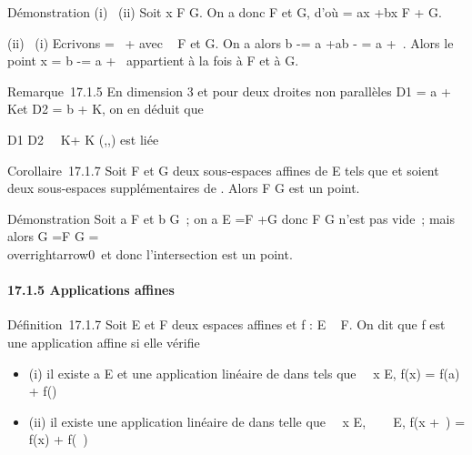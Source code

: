 Démonstration (i) \rigtharrow~(ii) Soit x \in F \bigcap G. On a donc
\overrightarrowax \in\overrightarrow
F et \overrightarrowxb
\in\overrightarrow G, d'où
\overrightarrowab =\overrightarrow
ax +\overrightarrow bx
\in\overrightarrow F +\overrightarrow
G.

(ii) \rigtharrow~(i) Ecrivons \overrightarrowab
=\overrightarrow \xi~ +\overrightarrow
\eta avec \overrightarrow\xi~
\in\overrightarrow F et
\overrightarrow\eta \in\overrightarrow
G. On a alors b -\overrightarrow \eta = a
+\overrightarrow ab -\overrightarrow
\eta = a +\overrightarrow \xi~. Alors le point x = b
-\overrightarrow \eta = a
+\overrightarrow \xi~ appartient à la fois à F et à G.

Remarque~17.1.5 En dimension 3 et pour deux droites non parallèles
D1 = a + K\vecu et D2 = b +
K\vecv, on en déduit que

D1 \bigcap
D2\neq~\varnothing~\mathrel\Leftrightarrow
\overrightarrowab \in K\vecu +
K\vecv \Leftrightarrow
(\overrightarrowab,\vecu,\vecv)\text
est liée 

Corollaire~17.1.7 Soit F et G deux sous-espaces affines de E tels que
\overrightarrowF et
\overrightarrowG soient deux sous-espaces
supplémentaires de \overrightarrowE. Alors F \bigcap G est
un point.

Démonstration Soit a \in F et b \in G~; on a
\overrightarrowab \in\overrightarrow
E =\overrightarrow F
+\overrightarrow G donc F \bigcap G n'est pas vide~; mais
alors \overrightarrowF \bigcap G
=\overrightarrow F \bigcap\overrightarrow
G =
\\overrightarrow0\
et donc l'intersection est un point.

\paragraph{17.1.5 Applications affines}

Définition~17.1.7 Soit E et F deux espaces affines et f : E \rightarrow~ F. On dit
que f est une application affine si elle vérifie

\begin{itemize}
\itemsep1pt\parskip0pt
\item
  (i) il existe a \in E et une application linéaire
  \vecf de \overrightarrowE dans
  \overrightarrowF tels que
  \forall~~x \in E, f(x) = f(a) +\vec
  f(\overrightarrowax)
\item
  (ii) il existe une application linéaire \vecf de
  \overrightarrowE dans
  \overrightarrowF telle que
  \forall~~x \in E,
  \forall~\overrightarrow\xi~~
  \in\overrightarrow E, f(x
  +\overrightarrow \xi~) = f(x) +\vec
  f(\overrightarrow\xi~)
\end{itemize}

